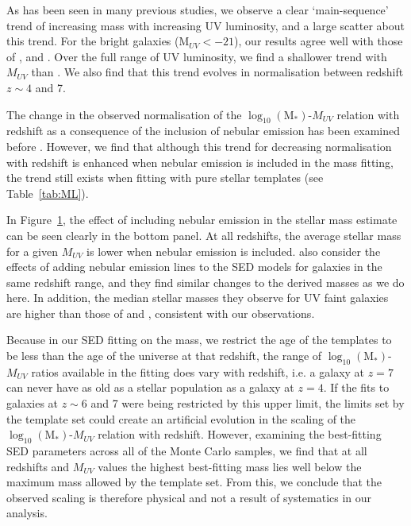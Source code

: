\begin{figure}
\label{fig:MLratios}
\end{figure}

As has been seen in many previous studies, we observe a clear `main-sequence' trend of increasing mass with increasing UV luminosity, and a large scatter about this trend. For the bright galaxies (M$_{UV} < -21$), our results agree well with those of \citet{2009ApJ...697.1493S}, \citet{Gonzalez:2011dn} and \citet{2012ApJ...752...66L}. Over the full range of UV luminosity, we find a shallower trend with $M_{UV}$ than \citet{Gonzalez:2011dn}. We also find that this trend evolves in normalisation between redshift $z \sim 4$ and 7. 

The change in the observed normalisation of the $\log_{10} (\text{M}_{*})$-$M_{UV}$ relation with redshift as a consequence of the inclusion of nebular emission has been examined before \citep{Shim:2011cw,deBarros:2012wa,Schenker:2013ep,Stark:2013ix}. However, we find that although this trend for decreasing normalisation with redshift is enhanced when nebular emission is included in the mass fitting, the trend still exists when fitting with pure stellar templates (see Table~\ref{tab:ML}). 

In Figure~\ref{fig:MLratios}, the effect of including nebular emission in the stellar mass estimate can be seen clearly in the bottom panel. At all redshifts, the average stellar mass for a given $M_{UV}$ is lower when nebular emission is included. \citet{Salmon:2014tm} also consider the effects of adding nebular emission lines to the SED models for galaxies in the same redshift range, and they find similar changes to the derived masses as we do here. In addition, the median stellar masses they observe for UV faint galaxies are higher than those of \citet{Gonzalez:2011dn} and \citet{2012ApJ...752...66L}, consistent with our observations.

Because in our SED fitting on the mass, we restrict the age of the templates to be less than the age of the universe at that redshift, the range of $\log_{10} (\text{M}_{*})$-$M_{UV}$ ratios available in the fitting does vary with redshift, i.e. a galaxy at $z = 7$ can never have as old as a stellar population as a galaxy at $z = 4$. If the fits to galaxies at $z \sim 6$ and 7 were being restricted by this upper limit, the limits set by the template set could create an artificial evolution in the scaling of the $\log_{10} (\text{M}_{*})$-$M_{UV}$ relation with redshift. However, examining the best-fitting SED parameters across all of the Monte Carlo samples, we find that at all redshifts and $M_{UV}$ values the highest best-fitting mass lies well below the maximum mass allowed by the template set. From this, we conclude that the observed scaling is therefore physical and not a result of systematics in our analysis. 

